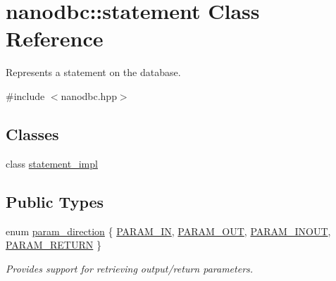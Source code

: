 \hypertarget{classnanodbc_1_1statement}{}\section{nanodbc\+::statement Class Reference}
\label{classnanodbc_1_1statement}


Represents a statement on the database.  




{\ttfamily \#include $<$nanodbc.\+hpp$>$}

\subsection*{Classes}
\begin{DoxyCompactItemize}
\item 
class \mbox{\hyperlink{classnanodbc_1_1statement_1_1statement__impl}{statement\+\_\+impl}}
\end{DoxyCompactItemize}
\subsection*{Public Types}
\begin{DoxyCompactItemize}
\item 
enum \mbox{\hyperlink{classnanodbc_1_1statement_a523142f53cbbee8d68a074da993e7fa6}{param\+\_\+direction}} \{ \mbox{\hyperlink{classnanodbc_1_1statement_a523142f53cbbee8d68a074da993e7fa6ae33f42ce0677d00c291ff4d8e39f99de}{P\+A\+R\+A\+M\+\_\+\+IN}}, 
\mbox{\hyperlink{classnanodbc_1_1statement_a523142f53cbbee8d68a074da993e7fa6a62f755c84582e1dc9e5a8c0ab703e615}{P\+A\+R\+A\+M\+\_\+\+O\+UT}}, 
\mbox{\hyperlink{classnanodbc_1_1statement_a523142f53cbbee8d68a074da993e7fa6a75c3aa96cde8c4cbd8c58e3837fbdc5b}{P\+A\+R\+A\+M\+\_\+\+I\+N\+O\+UT}}, 
\mbox{\hyperlink{classnanodbc_1_1statement_a523142f53cbbee8d68a074da993e7fa6a2ee8caf768eba50d5b8517ba832b69f4}{P\+A\+R\+A\+M\+\_\+\+R\+E\+T\+U\+RN}}
 \}
\begin{DoxyCompactList}\small\item\em Provides support for retrieving output/return parameters. \end{DoxyCompactList}\end{DoxyCompactItemize}
